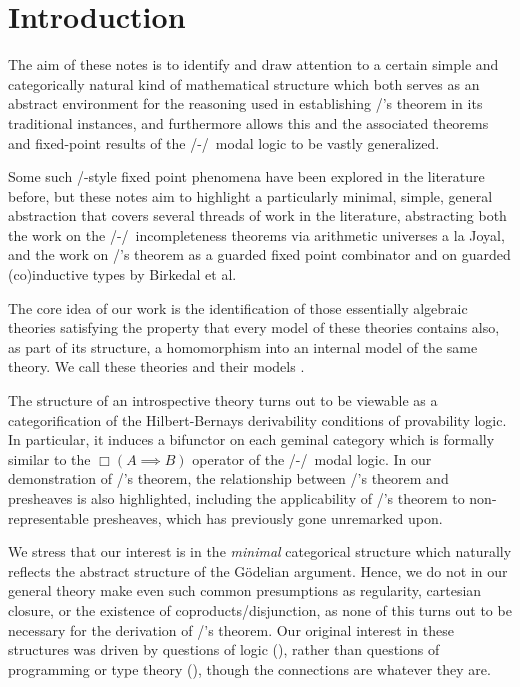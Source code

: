 \filestart

\section{Introduction}
The aim of these notes is to identify and draw attention to a certain simple and categorically natural kind of mathematical structure which both serves as an abstract environment for the reasoning used in establishing \Loeb/'s theorem in its traditional instances, and furthermore allows this and the associated theorems and fixed-point results of the \Goedel/-\Loeb/\ modal logic to be vastly generalized.

Some such \Loeb/-style fixed point phenomena have been explored in the literature before, but these notes aim to highlight a particularly minimal, simple, general abstraction that covers several threads of work in the literature, abstracting both the work on the \Goedel/-\Loeb/\ incompleteness theorems via arithmetic universes a la Joyal, and the work on \Loeb/'s theorem as a guarded fixed point combinator and on guarded (co)inductive types by Birkedal et al.

The core idea of our work is the identification of those essentially algebraic theories satisfying the property that every model of these theories contains also, as part of its structure, a homomorphism into an internal model of the same theory. We call these theories  and their models .

The structure of an introspective theory turns out to be viewable as a categorification of the Hilbert-Bernays derivability conditions of provability logic. In particular, it induces a bifunctor on each geminal category which is formally similar to the $\Box(A \implies B)$ operator of the \Goedel/-\Loeb/\ modal logic. In our demonstration of \Loeb/'s theorem, the relationship between \Loeb/'s theorem and presheaves is also highlighted, including the applicability of \Loeb/'s theorem to non-representable presheaves, which has previously gone unremarked upon.

We stress that our interest is in the \emph{minimal} categorical structure which naturally reflects the abstract structure of the G\"odelian argument. Hence, we do not in our general theory make even such common presumptions as regularity, cartesian closure, or the existence of coproducts/disjunction, as none of this turns out to be necessary for the derivation of \Loeb/'s theorem. Our original interest in these structures was driven by questions of logic (), rather than questions of programming or type theory (), though the connections are whatever they are.

